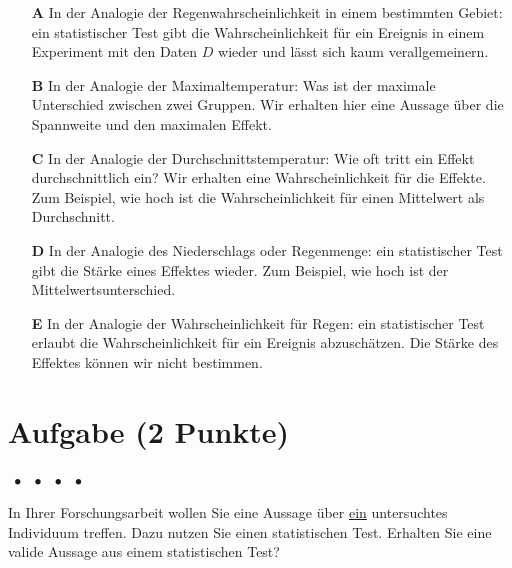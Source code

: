 \documentclass[a4paper, 9pt]{scrartcl}\usepackage[]{graphicx}\usepackage[]{xcolor}
\begin{document}
\begin{enumerate}
\item [\textbf{A} \msquare] In der Analogie der Regenwahrscheinlichkeit in einem bestimmten Gebiet: ein statistischer Test gibt die Wahrscheinlichkeit für ein Ereignis in einem Experiment mit den Daten $D$ wieder und lässt sich kaum verallgemeinern.
\item [\textbf{B} \msquare] In der Analogie der Maximaltemperatur: Was ist der maximale Unterschied zwischen zwei Gruppen. Wir erhalten hier eine Aussage über die Spannweite und den maximalen Effekt.
\item [\textbf{C} \msquare] In der Analogie der Durchschnittstemperatur: Wie oft tritt ein Effekt durchschnittlich ein? Wir erhalten eine Wahrscheinlichkeit für die Effekte. Zum Beispiel, wie hoch ist die Wahrscheinlichkeit für einen Mittelwert als Durchschnitt.
\item [\textbf{D} \msquare] In der Analogie des Niederschlags oder Regenmenge: ein statistischer Test gibt die Stärke eines Effektes wieder. Zum Beispiel, wie hoch ist der Mittelwertsunterschied.
\item [\textbf{E} \msquare] In der Analogie der Wahrscheinlichkeit für Regen: ein statistischer Test erlaubt die Wahrscheinlichkeit für ein Ereignis abzuschätzen. Die Stärke des Effektes können wir nicht bestimmen.
\end{enumerate}

\section{Aufgabe \hfill (2 Punkte)}

\ifcollection
\begin{flushright}
\tiny\vspace{-2Ex}
\textbf{\examinhaltstart}
\exammodulemathstat $\;\bullet$
\exammodulestat $\;\bullet$
\exammodulestatbbv $\;\bullet$
\exammodulestatversuch $\;\bullet$
\exammodulebiostat
\vspace{-1Ex}
\end{flushright}
\fi




In Ihrer Forschungsarbeit wollen Sie eine Aussage über \underline{ein} untersuchtes Individuum treffen. Dazu nutzen Sie einen statistischen Test. Erhalten Sie eine valide Aussage aus einem statistischen Test?
\end{document}
